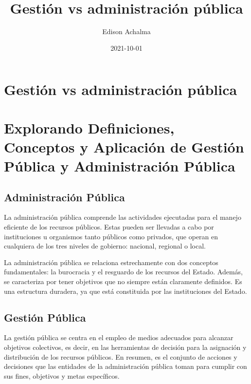 \documentclass[
  jou,
  floatsintext,
  longtable,
  a4paper,
  nolmodern,
  notxfonts,
  notimes,
  12pt,
  colorlinks=true,linkcolor=blue,citecolor=blue,urlcolor=blue]{apa7}
\title{Gestión vs administración pública}
\author{Edison Achalma}
\affiliation{
{Escuela Profesional de Economía, Universidad Nacional de San Cristóbal
de Huamanga}}
\date{2021-10-01}
\begin{document}
\maketitle


\hypertarget{toc}{}
\tableofcontents
\newpage
\section[Introduction]{Gestión vs administración pública}

\setcounter{secnumdepth}{3}

\setlength\LTleft{0pt}




\section{Explorando Definiciones, Conceptos y Aplicación de Gestión
Pública y Administración
Pública}\label{explorando-definiciones-conceptos-y-aplicaciuxf3n-de-gestiuxf3n-puxfablica-y-administraciuxf3n-puxfablica}

\subsection{Administración Pública}\label{administraciuxf3n-puxfablica}

La administración pública comprende las actividades ejecutadas para el
manejo eficiente de los recursos públicos. Estas pueden ser llevadas a
cabo por instituciones u organismos tanto públicos como privados, que
operan en cualquiera de los tres niveles de gobierno: nacional, regional
o local.

La administración pública se relaciona estrechamente con dos conceptos
fundamentales: la burocracia y el resguardo de los recursos del Estado.
Además, se caracteriza por tener objetivos que no siempre están
claramente definidos. Es una estructura duradera, ya que está
constituida por las instituciones del Estado.

\subsection{Gestión Pública}\label{gestiuxf3n-puxfablica}

La gestión pública se centra en el empleo de medios adecuados para
alcanzar objetivos colectivos, es decir, en las herramientas de decisión
para la asignación y distribución de los recursos públicos. En resumen,
es el conjunto de acciones y decisiones que las entidades de la
administración pública toman para cumplir con sus fines, objetivos y
metas específicos.
\end{document}
